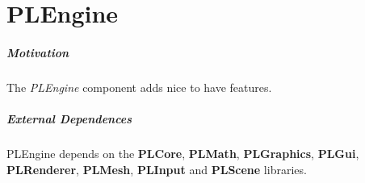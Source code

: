 \chapter{PLEngine}


\paragraph{Motivation}
The \emph{PLEngine} component adds nice to have features.


\paragraph{External Dependences}
PLEngine depends on the \textbf{PLCore}, \textbf{PLMath}, \textbf{PLGraphics}, \textbf{PLGui}, \textbf{PLRenderer}, \textbf{PLMesh}, \textbf{PLInput} and \textbf{PLScene} libraries.





\cleardoublepage

